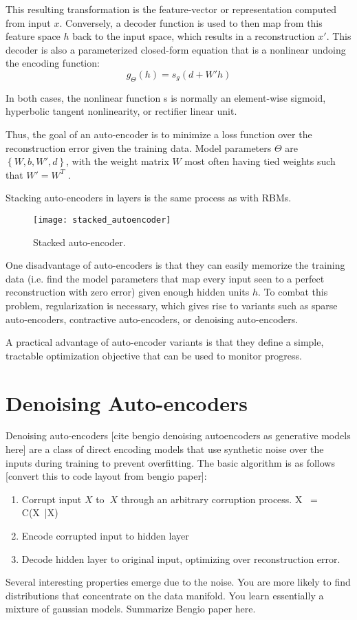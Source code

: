 This resulting transformation is the feature-vector or representation computed from input \(x\).
Conversely, a decoder function is used to then map from this feature space \(h\) back to the input space, which results in a reconstruction \(x'\). This decoder is also a parameterized closed-form equation that is a nonlinear undoing the encoding function:
\[g_\Theta (h) = s_g (d + W' h)\]

In both cases, the nonlinear function s is normally an element-wise sigmoid, hyperbolic tangent nonlinearity, or rectifier linear unit.

Thus, the goal of an auto-encoder is to minimize a loss function over the reconstruction error given the training data. Model parameters \(\Theta\) are \(\left\{W,b,W',d\right\}\), with the weight matrix \(W\) most often having tied weights such that \(W' = W^T\) .

Stacking auto-encoders in layers is the same process as with RBMs.
\begin{figure}[h!]
  \centering
    \texttt{[image: stacked\_autoencoder]}
\caption{Stacked auto-encoder.}
\end{figure}

One disadvantage of auto-encoders is that they can easily memorize the training data (i.e. find the model parameters that map every input seen to a perfect reconstruction with zero error) given enough hidden units \(h\). To combat this problem, regularization is necessary, which gives rise to variants such as sparse auto-encoders, contractive auto-encoders, or denoising auto-encoders.

A practical advantage of auto-encoder variants is that they define a simple, tractable optimization objective that can be used to monitor progress.

\section{Denoising Auto-encoders}
Denoising auto-encoders [cite bengio denoising autoencoders as generative models here] are a class of direct encoding models that use synthetic noise over the inputs during training to prevent overfitting. The basic algorithm is as follows [convert this to code layout from bengio paper]:
\begin{enumerate}
\item Corrupt input \(X\) to \(~X\) through an arbitrary corruption process. X~ = C(X~|X)
\item Encode corrupted input to hidden layer
\item Decode hidden layer to original input, optimizing over reconstruction error.
\end{enumerate}

Several interesting properties emerge due to the noise. You are more likely to find distributions that concentrate on the data manifold. You learn essentially a mixture of gaussian models. Summarize Bengio paper here.



